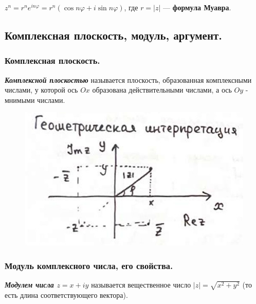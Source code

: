 $z^n = r^n e^{in\varphi} = r^n(\cos n \varphi + i \sin n \varphi)$, где $r = |z|$ — \textbf{формула Муавра}.


\newpage


\subsection{
    Комплексная плоскость, модуль, аргумент.
}

\subsubsection{
    Комплексная плоскость.
}

\begin{definition}
    \textbf{\textit{Комплексной плоскостью}} называется плоскость, образованная комплексными числами, у которой ось $Ox$ образована действительными числами, а ось $Oy$ - мнимыми числами.
\end{definition}

\begin{figure}[H]
    \centering
    \includegraphics[scale=0.6]{images/1_1.jpg}
    \label{fig:picture_1_1}
\end{figure}

\subsubsection{
    Модуль комплексного числа, его свойства.
}

\begin{definition}
    \textbf{\textit{Модулем числа $z = x + iy$}} называется вещественное число $|z| = \sqrt{x^2 + y^2}$ (то есть длина соответствующего вектора).
\end{definition}

